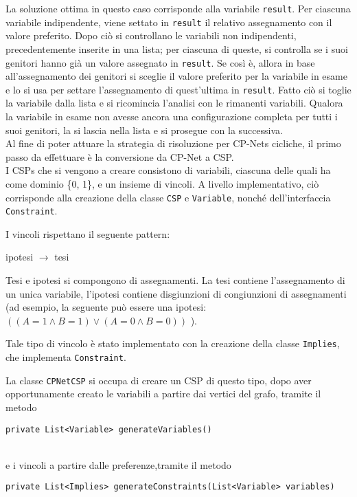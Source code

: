 La soluzione ottima in questo caso corrisponde alla variabile \texttt{result}.
Per ciascuna variabile indipendente, viene settato in \texttt{result} il relativo assegnamento con il valore preferito.
Dopo ciò si controllano le variabili non indipendenti, precedentemente inserite in una lista; per ciascuna di queste, si controlla se i suoi genitori hanno già un valore assegnato in \texttt{result}. Se così è, allora in base all'assegnamento dei genitori si sceglie il valore preferito per la variabile in esame e lo si usa per settare l'assegnamento di quest'ultima in \texttt{result}. Fatto ciò si toglie la variabile dalla lista e si ricomincia l'analisi con le rimanenti variabili. Qualora la variabile in esame non avesse ancora una configurazione completa per tutti i suoi genitori, la si lascia nella lista e si prosegue con la successiva.
\\
Al fine di poter attuare la strategia di risoluzione per CP-Nets cicliche, il primo passo da effettuare è la conversione da CP-Net a CSP. 
\\
I CSPs che si vengono a creare consistono di variabili, ciascuna delle quali ha come dominio \{0, 1\}, e un insieme di vincoli.
A livello implementativo, ciò corrisponde alla creazione della classe \texttt{CSP} e \texttt{Variable}, nonché dell'interfaccia \texttt{Constraint}.
 
I vincoli rispettano il seguente pattern:
\\
\centerline{ipotesi $\rightarrow$ tesi}

Tesi e ipotesi si compongono di assegnamenti. La tesi contiene l'assegnamento di un unica variabile, l'ipotesi contiene disgiunzioni di congiunzioni di assegnamenti (ad esempio, la seguente può essere una ipotesi: $( (A=1 \land B=1) \lor (A=0 \land B=0))$ ). 

Tale tipo di vincolo è stato implementato con la creazione della classe \texttt{Implies}, che implementa \texttt{Constraint}.


La classe \texttt{CPNetCSP} si occupa di creare un CSP di questo tipo, dopo aver opportunamente creato le variabili a partire dai vertici del grafo, tramite il metodo
\\
\centerline{\texttt{private List<Variable> generateVariables()}}
\\
e i vincoli a partire dalle preferenze,tramite il metodo
\\
\centerline{\texttt{private List<Implies> generateConstraints(List<Variable> variables)}}
\\

